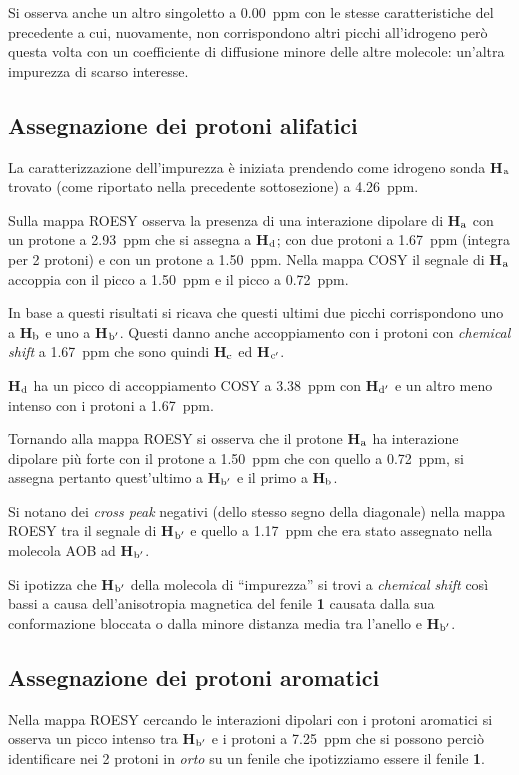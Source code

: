 \documentclass[a4paper, italian, oneside, 12pt]{article}
\begin{document}
Si osserva anche un altro singoletto a 0.00~ppm con le stesse caratteristiche del precedente a cui, nuovamente, non corrispondono altri picchi all'idrogeno però questa volta con un coefficiente di diffusione minore delle altre molecole: un'altra impurezza di scarso interesse.

\subsection{Assegnazione dei protoni alifatici}
La caratterizzazione dell'impurezza è iniziata prendendo come idrogeno sonda {\bf{H$_{\textrm a}$}} trovato (come riportato nella precedente sottosezione) a 4.26~ppm. 

Sulla mappa ROESY osserva la presenza di una interazione dipolare di {\bf{H$_{\textrm a}$}} con un protone a 2.93~ppm che si assegna a {\bf{H$_{\textrm d}$}}; con due protoni a 1.67~ppm (integra per 2 protoni) e con un protone a 1.50~ppm. Nella mappa COSY il segnale di {\bf{H$_{\textrm a}$}} accoppia con il picco a 1.50~ppm e il picco a 0.72~ppm.

In base a questi risultati si ricava che questi ultimi due picchi corrispondono uno a {\bf{H$_{\textrm b}$}} e uno a {\bf{H$_{\textrm b'}$}}. Questi danno anche accoppiamento con i protoni con {\emph{chemical shift}} a 1.67~ppm che sono quindi {\bf{H$_{\textrm c}$}} ed {\bf{H$_{\textrm c'}$}}. 

{\bf{H$_{\textrm d}$}} ha un picco di accoppiamento COSY a 3.38~ppm con {\bf{H$_{\textrm d'}$}} e un altro meno intenso con i protoni a 1.67~ppm.

Tornando alla mappa ROESY si osserva che il protone {\bf{H$_{\textrm a}$}} ha interazione dipolare più forte con il protone a 1.50~ppm che con quello a 0.72~ppm, si assegna pertanto quest'ultimo a {\bf{H$_{\textrm b'}$}} e il primo a {\bf{H$_{\textrm b}$}}.

Si notano dei {\emph{cross peak}} negativi (dello stesso segno della diagonale) nella mappa ROESY tra il segnale di {\bf{H$_{\textrm b'}$}} e quello a 1.17~ppm che era stato assegnato nella molecola AOB ad {\bf{H$_{\textrm b'}$}}.

Si ipotizza che {\bf{H$_{\textrm b'}$}} della molecola di “impurezza” si trovi a {\emph{chemical shift}} così bassi a causa dell'anisotropia magnetica del fenile {\bf{1}} causata dalla sua conformazione bloccata o dalla minore distanza media tra l'anello e {\bf{H$_{\textrm b'}$}}.

\subsection{Assegnazione dei protoni aromatici}
Nella mappa ROESY cercando le interazioni dipolari con i protoni aromatici si osserva un picco intenso tra {\bf{H$_{\textrm b'}$}} e i protoni a 7.25~ppm che si possono perciò identificare nei 2 protoni in \emph{orto} su un fenile che ipotizziamo essere il fenile {\bf{1}}. 
\end{document}
